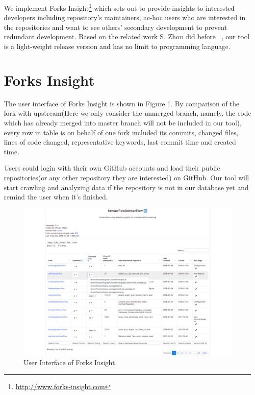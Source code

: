 We implement Forks Insight\footnote{\url{http://www.forks-insight.com}} which sets out to provide insights to interested developers including repository's maintainers, ac-hoc users who are interested in the repositories and want to see others' secondary development to prevent redundant development. Based on the related work S. Zhou did before ~\cite{ZSLXWK:ICSE18}, our tool is a light-weight release version and has no limit to programming language.


\section{Forks Insight}

The user interface of Forks Insight is shown in Figure 1. By comparison of the fork with upstream(Here we only consider the unmerged branch, namely, the code which has already merged into master branch will not be included in our tool), every row in table is on behalf of one fork included its commits, changed files, lines of code changed, representative keywords, last commit time and created time.


Users could login with their own GitHub accounts and load their public repositories(or any other repository they are interested) on GitHub. Our tool will start crawling and analyzing data if the repository is not in our database yet and remind the user when it's finished.

\begin{figure}[H]
\includegraphics[scale=0.3]{tensorflow_snapshot3.pdf}
\caption{User Interface of Forks Insight.}
\end{figure}


